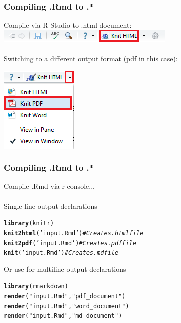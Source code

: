 \documentclass{beamer}\usepackage[]{graphicx}\usepackage[]{color}
\makeatletter
\newcommand{\hlstr}[1]{\textcolor[rgb]{0.192,0.494,0.8}{#1}}%
\newcommand{\hlcom}[1]{\textcolor[rgb]{0.678,0.584,0.686}{\textit{#1}}}%
\newcommand{\hlstd}[1]{\textcolor[rgb]{0.345,0.345,0.345}{#1}}%
\newcommand{\hlkwd}[1]{\textcolor[rgb]{0.737,0.353,0.396}{\textbf{#1}}}%
\newenvironment{kframe}{%
 \def\at@end@of@kframe{}%
 \ifinner\ifhmode%
  \def\at@end@of@kframe{\end{minipage}}%
  \begin{minipage}{\columnwidth}%
 \fi\fi%
 \def\FrameCommand##1{\hskip\@totalleftmargin \hskip-\fboxsep
 \colorbox{shadecolor}{##1}\hskip-\fboxsep
     \hskip-\linewidth \hskip-\@totalleftmargin \hskip\columnwidth}%
 \MakeFramed {\advance\hsize-\width
   \@totalleftmargin\z@ \linewidth\hsize
   \@setminipage}}%
 {\par\unskip\endMakeFramed%
 \at@end@of@kframe}
\newenvironment{knitrout}{}{} %
\makeatother
\begin{document}
\begin{frame}[fragile]
\frametitle{Compiling .Rmd to .*}
Compile via R Studio to .html document:
\includegraphics[scale=0.5]{img/rmd/compile_rmd.png}
\\$ $\\
Switching to a different output format (pdf in this case): \\
\begin{center}
\includegraphics[scale=0.5]{img/rmd/other_options.png}
\end{center}
\end{frame}

\begin{frame}[fragile]
\frametitle{Compiling .Rmd to .* }
Compile .Rmd via r console...
\\$ $\\
Single line output declarations
\begin{knitrout}
\color{fgcolor}\begin{kframe}
\begin{alltt}
\hlkwd{library}\hlstd{(knitr)}
\hlkwd{knit2html}\hlstd{(}\hlstr{'input.Rmd'}\hlstd{)} \hlcom{# Creates .html file}
\hlkwd{knit2pdf}\hlstd{(}\hlstr{'input.Rmd'}\hlstd{)}  \hlcom{# Creates .pdf file}
\hlkwd{knit}\hlstd{(}\hlstr{'input.Rmd'}\hlstd{)}      \hlcom{# Creates .md file}
\end{alltt}
\end{kframe}
\end{knitrout}

Or use for multiline output declarations
\begin{knitrout}
\color{fgcolor}\begin{kframe}
\begin{alltt}
\hlkwd{library}\hlstd{(rmarkdown)}
\hlkwd{render}\hlstd{(}\hlstr{"input.Rmd"}\hlstd{,} \hlstr{"pdf_document"}\hlstd{)}
\hlkwd{render}\hlstd{(}\hlstr{"input.Rmd"}\hlstd{,} \hlstr{"word_document"}\hlstd{)}
\hlkwd{render}\hlstd{(}\hlstr{"input.Rmd"}\hlstd{,} \hlstr{"md_document"}\hlstd{)}
\end{alltt}
\end{kframe}
\end{knitrout}
\end{frame}
\end{document}
